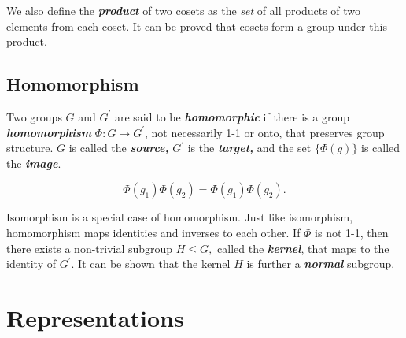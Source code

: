 \documentclass{article}
\begin{document}
We also define the \textit{\textbf{product}} of two cosets as the \textit{set} of all products of two elements from each coset. It can be proved that cosets form a group under this product. 

\subsection{Homomorphism}
Two groups $G$ and $G^\prime $ are said to be \textit{\textbf{homomorphic}} if there is a group \textit{\textbf{homomorphism}} $\Phi: G\to G^\prime$, not necessarily 1-1 or onto, that preserves group structure. $G$ is called the \textit{\textbf{source,}} $G^\prime $ is the \textit{\textbf{target,}} and the set $\{\Phi(g)\}$ is called the \textit{\textbf{image}}. 

\[
    \Phi(g_1) \Phi(g_2) = \Phi(g_1) \Phi(g_2).
\]

Isomorphism is a special case of homomorphism. Just like isomorphism, homomorphism maps identities and inverses to each other. If $\Phi$ is not 1-1, then there exists a non-trivial subgroup $H \leq G,$ called the \textit{\textbf{kernel}}, that maps to the identity of $G^\prime.$ It can be shown that the kernel $H$ is further a \textit{\textbf{normal}} subgroup. 
\section{Representations}
\end{document}
